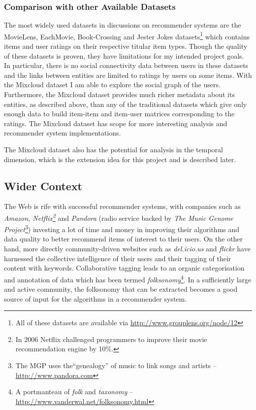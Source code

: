 \subsubsection*{Comparison with other Available Datasets}

The most widely used datasets in discussions on recommender systems are the MovieLens, EachMovie, Book-Crossing and Jester Jokes datasets\footnote{All of these datasets are available via \url{http://www.grouplens.org/node/12}} which contains items and user ratings on their respective titular item types. Though the quality of these datasets is proven, they have limitations for my intended project goals. In particular, there is no social connectivity data between users in these datasets and the links between entities are limited to ratings by users on some items. With the Mixcloud dataset I am able to explore the social graph of the users. Furthermore, the Mixcloud dataset provides much richer metadata about its entities, as described above, than any of the traditional datasets which give only enough data to build item-item and item-user matrices corresponding to the ratings. The Mixcloud dataset has scope for more interesting analysis and recommender system implementations.

The Mixcloud dataset also has the potential for analysis in the temporal dimension, which is the extension idea for this project and is described later.

\subsection*{Wider Context}

The Web is rife with successful recommender systems, with companies such as \textit{Amazon, Netflix\footnote{In 2006 Netflix challenged programmers to improve their movie recommendation engine by 10\%.}} and \textit{Pandora} (radio service backed by \textit{The Music Genome Project}\footnote{The MGP uses the``genealogy'' of music to link songs and artists -- \url{http://www.pandora.com}}) investing a lot of time and money in improving their algorithms and data quality to better recommend items of interest to their users. On the other hand, more directly community-driven websites such as \textit{del.icio.us} and \textit{flickr} have harnessed the collective intelligence of their users and their tagging of their content with keywords. Collaborative tagging leads to an organic categorisation and annotation of data which has been termed \textit{folksonomy}\footnote{A portmanteau of \textit{folk} and \textit{taxonomy} -- \url{http://www.vanderwal.net/folksonomy.html}}. In a sufficiently large and active community, the folksonomy that can be extracted becomes a good source of input for the algorithms in a recommender system. 

